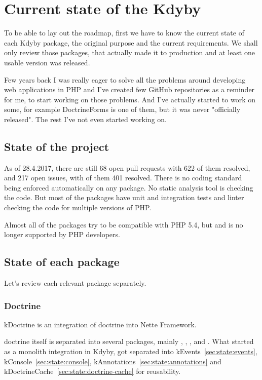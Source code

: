 \chapter{Current state of the Kdyby}

To be able to lay out the roadmap, first we have to know the current state of each Kdyby package, the original purpose and the current requirements. We shall only review those packages, that actually made it to production and at least one usable version was released.

Few years back I was really eager to solve all the problems around developing web applications in PHP and I've created few GitHub repositories as a reminder for me, to start working on those problems. And I've actually started to work on some, for example DoctrineForms is one of them, but it was never "officially released". The rest I've not even started working on.

\section{State of the project}

As of 28.4.2017, there are still 68 open pull requests with 622 of them resolved, and 217 open issues, with of them 401 resolved. There is no coding standard being enforced automatically on any package. No static analysis tool is checking the code. But most of the packages have unit and integration tests and linter checking the code for multiple versions of PHP.

Almost all of the packages try to be compatible with PHP 5.4, but  and is no longer supported by PHP developers.

\section{State of each package}

Let's review each relevant package separately.

\tocless\subsection{Doctrine} \label{sec:state:doctrine}

\gls{kDoctrine} is an integration of \gls{doctrine} into Nette Framework.

\gls{doctrine} itself is separated into several packages, mainly , , ,  and . What started as a monolith integration in Kdyby, got separated into \gls{kEvents}~\ref{sec:state:events}, \gls{kConsole}~\ref{sec:state:console}, \gls{kAnnotations}~\ref{sec:state:annotations} and \gls{kDoctrineCache}~\ref{sec:state:doctrine-cache} for reusability.

